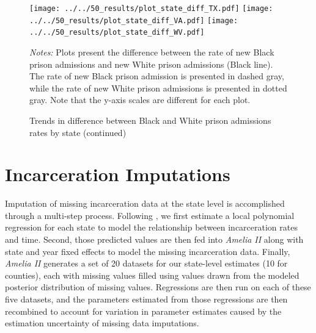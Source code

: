 \documentclass[12pt]{article}
\begin{document}
 \newpage
 \begin{figure}[h!]
 	\begin{center}
 	\caption{Trends in difference between Black and White prison admissions rates by state (continued)}
 	\small

 		\vspace{.2in}
 			\texttt{[image: ../../50\_results/plot\_state\_diff\_TX.pdf]}
 			\texttt{[image: ../../50\_results/plot\_state\_diff\_VA.pdf]}
       \texttt{[image: ../../50\_results/plot\_state\_diff\_WV.pdf]} \\
       \smallskip\smallskip\smallskip
 	\label{figure_difference_states2}
 	\end{center}
   {\scriptsize{\emph{Notes:} Plots present the difference between the rate of new Black prison admissions and new White prison admissions (Black line).  The rate of new Black prison admission is presented in dashed gray, while the rate of new White prison admissions is presented in dotted gray.  Note that the y-axis scales are different for each plot.}}
 \end{figure} \normalsize




 \section{Incarceration Imputations}\label{appendix_imputations}
 \setcounter{table}{0}
 \setcounter{figure}{0}
 \renewcommand{\thetable}{E\arabic{table}}
 \renewcommand{\thefigure}{E\arabic{figure}}
 \normalsize

 Imputation of missing incarceration data at the state level is accomplished through a multi-step process. Following , we first estimate a local polynomial regression for each state to model the relationship between incarceration rates and time. Second, those predicted values are then fed into \emph{Amelia II}  along with state and year fixed effects to model the missing incarceration data. Finally, \emph{Amelia II} generates a set of 20 datasets for our state-level estimates (10 for counties), each with missing values filled using values drawn from the modeled posterior distribution of missing values. Regressions are then run on each of these five datasets, and the parameters estimated from those regressions are then recombined to account for variation in parameter estimates caused by the estimation uncertainty of missing data imputations.
\end{document}
